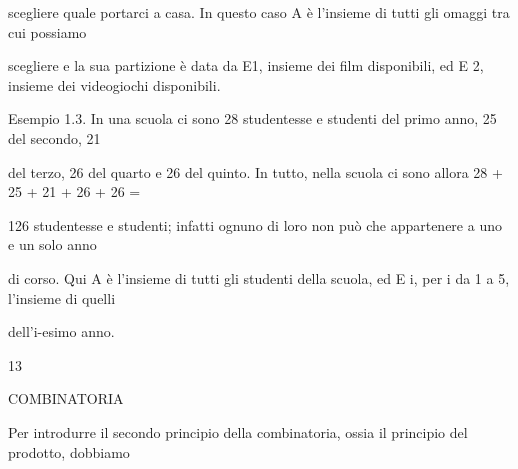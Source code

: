 \documentclass[a4paper,portrait,12pt]{article}
\begin{document}
\begin{flushleft}
scegliere quale portarci a casa. In questo caso A \`{e} l'insieme di tutti gli omaggi tra cui possiamo
\end{flushleft}


\begin{flushleft}
scegliere e la sua partizione \`{e} data da E1, insieme dei film disponibili, ed E 2, insieme dei videogiochi disponibili.
\end{flushleft}





\begin{flushleft}
Esempio 1.3. In una scuola ci sono 28 studentesse e studenti del primo anno, 25 del secondo, 21
\end{flushleft}


\begin{flushleft}
del terzo, 26 del quarto e 26 del quinto. In tutto, nella scuola ci sono allora 28 + 25 + 21 + 26 + 26 =
\end{flushleft}


\begin{flushleft}
126 studentesse e studenti; infatti ognuno di loro non pu\`{o} che appartenere a uno e un solo anno
\end{flushleft}


\begin{flushleft}
di corso. Qui A \`{e} l'insieme di tutti gli studenti della scuola, ed E i, per i da 1 a 5, l'insieme di quelli
\end{flushleft}


\begin{flushleft}
dell'i-esimo anno.
\end{flushleft}


13










\begin{flushleft}
COMBINATORIA
\end{flushleft}





\begin{flushleft}
Per introdurre il secondo principio della combinatoria, ossia il principio del prodotto, dobbiamo
\end{flushleft}
\end{document}
